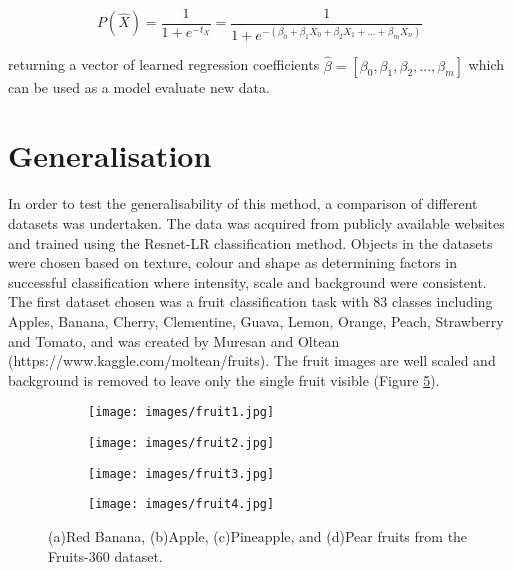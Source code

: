 \documentclass[conference]{IEEEtran}
\begin{document}
\begin{equation}
P(\hat{X}) = \frac{1}{1+e^{-t_X}} 
= \frac{1}{1+e^{-(\beta_0+\beta_1 X_0 + \beta_2         X_1+...+\beta_m X_n)}}
\end{equation}

returning a vector of learned regression coefficients $\hat{\beta}=[\beta_0, \beta_1, \beta_2,...,\beta_m]$ which can be used as a model evaluate new data. 









\section{Generalisation}


In order to test the generalisability of this method, a comparison of different datasets was undertaken. The data was acquired from publicly available websites and trained using the Resnet-LR classification method. Objects in the datasets were chosen based on texture, colour and shape as determining factors in successful classification where intensity, scale and background were consistent. The first dataset chosen was a fruit classification task with 83 classes including Apples, Banana, Cherry, Clementine, Guava, Lemon, Orange, Peach, Strawberry and Tomato, and was created by Muresan and Oltean \cite{muresan} (https://www.kaggle.com/moltean/fruits). The fruit images are well scaled and background is removed to leave only the single fruit visible (Figure \ref{fig:fruits}).


\begin{figure}[ht]
	\centering
	\begin{subfigure}{0.45\linewidth}
		\centering
		\texttt{[image: images/fruit1.jpg]}
		\caption{}
		\label{fig:fr1}
	\end{subfigure}%
	\begin{subfigure}{0.45\linewidth}
		\centering
		\texttt{[image: images/fruit2.jpg]}
		\caption{}
		\label{fig:fr2}
	\end{subfigure}%
	
	\begin{subfigure}{0.45\linewidth}
		\centering
		\texttt{[image: images/fruit3.jpg]}
		\caption{}
		\label{fig:fr3}
	\end{subfigure}%
	\begin{subfigure}{0.45\linewidth}
		\centering
		\texttt{[image: images/fruit4.jpg]}
		\caption{}
		\label{fig:fr4}
	\end{subfigure}%
	
	\caption{(a)Red Banana, (b)Apple, (c)Pineapple, and (d)Pear fruits from the Fruits-360 dataset.}
	\label{fig:fruits}
\end{figure}
\end{document}
